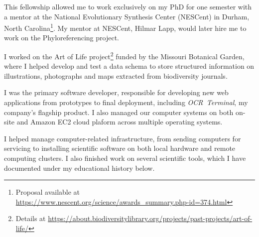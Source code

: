 
\nopagebreak
This fellowship allowed me to work exclusively on my PhD for one semester with a mentor at the National Evolutionary Synthesis Center (NESCent) in Durham, North Carolina\footnote{Proposal available at \url{https://www.nescent.org/science/awards\_summary.php-id=374.html}}. My mentor at NESCent, Hilmar Lapp, would later hire me to work on the Phyloreferencing project.


I worked on the Art of Life project\footnote{Details at \url{https://about.biodiversitylibrary.org/projects/past-projects/art-of-life/}} funded by the Missouri Botanical Garden, where I helped develop and test a data schema to store structured information on illustrations, photographs and maps extracted from biodiversity journals.

\begin{products}


\end{products}


I was the primary software developer, responsible for developing new web applications from prototypes to final deployment, including {\it OCR~Terminal}, my company's flagship product. I also managed our computer systems on both on-site and Amazon EC2 cloud plaform across multiple operating systems.


I helped manage computer-related infrastructure, from sending computers for servicing to installing scientific software on both local hardware and remote computing clusters. I also finished work on several scientific tools, which I have documented under my educational history below.